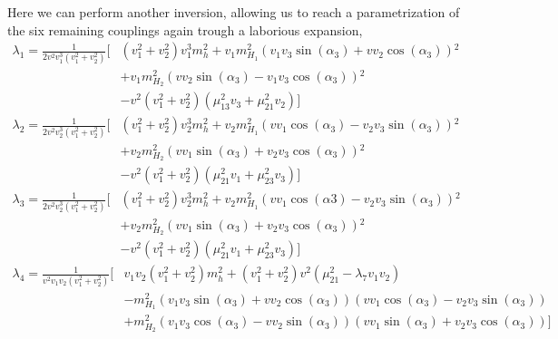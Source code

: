 Here we can perform another inversion, allowing us to reach a parametrization of the six remaining couplings again trough a laborious expansion, 
\begin{equation}
\begin{split}
\lambda_1 = \frac{1}{2 v^2 v_1^3 \left(v_1^2+v_2^2\right)} \Bigg[ & \left(v_1^2+v_2^2\right) v_1^3 m_h^2+v_1 m_{H_1}^2 \left(v_1 v_3 \sin (\alpha_3)+v v_2 \cos (\alpha_3)\right){}^2 \\ & + v_1 m_{H_2}^2 \left(v v_2 \sin(\alpha_3)-v_1 v_3 \cos (\alpha_3)\right){}^2 \\ & -v^2 \left(v_1^2+v_2^2\right) \left(\mu_{13}^2 v_3+\mu_{21}^2 v_2 \right) \Bigg] 
\end{split} 
\end{equation}
%
\begin{equation}
\begin{split}
\lambda_2 = \frac{1}{2 v^2 v_2^3 \left(v_1^2+v_2^2\right)} \Bigg[ & \left(v_1^2+v_2^2\right) v_2^3 m_h^2+v_2 m_{H_1}^2 \left(v v_1 \cos (\alpha_3) - v_2 v_3 \sin (\alpha_3)\right){}^2 \\ & +v_2 m_{H_2}^2 \left(v v_1 \sin (\alpha_3)+v_2 v_3 \cos (\alpha_3)\right){}^2 \\ & -v^2 \left(v_1^2+v_2^2\right) \left(\mu_{21}^2 v_1+\mu_{23}^2 v_3\right) \Bigg] 
\end{split} 
\end{equation}
%
\begin{equation}
\begin{split}
\lambda_3  = \frac{1}{2 v^2 v_2^3 \left(v_1^2+v_2^2\right)} \Bigg[ & \left(v_1^2+v_2^2\right) v_2^3 m_h^2+v_2 m_{H_1}^2 \left(v v_1 \cos (\text{$\alpha $3})-v_2 v_3 \sin (\alpha_3)\right){}^2 \\ & +v_2 m_{H_2}^2 \left(v v_1 \sin (\alpha_3)  + v_2 v_3 \cos (\alpha_3)\right){}^2  \\ & - v^2 \left(v_1^2+v_2^2\right) \left(\mu_{21}^2 v_1+\mu_{23}^2 v_3\right) \Bigg]  
\end{split} 
\end{equation}
%
\begin{equation}
\begin{split}
\lambda_4 = \frac{1}{v^2 v_1 v_2 \left(v_1^2+v_2^2\right)} \Bigg[ & v_1 v_2 \left(v_1^2+v_2^2\right) m_h^2 + \left(v_1^2+v_2^2\right) v^2 \left(\mu_{21}^2-\lambda_7 v_1 v_2\right) \\ & -m_{H_1}^2 \left(v_1 v_3 \sin (\alpha_3)+v v_2 \cos (\alpha_3)\right) \left(v v_1 \cos (\alpha_3)  -v_2 v_3 \sin (\alpha_3)\right) \\ & + m_{H_2}^2 \left(v_1 v_3 \cos (\alpha_3)- v v_2 \sin (\alpha_3)\right) \left(v v_1 \sin (\alpha_3)+v_2 v_3 \cos (\alpha_3)\right)   \Bigg] 
\end{split} 
\end{equation}
